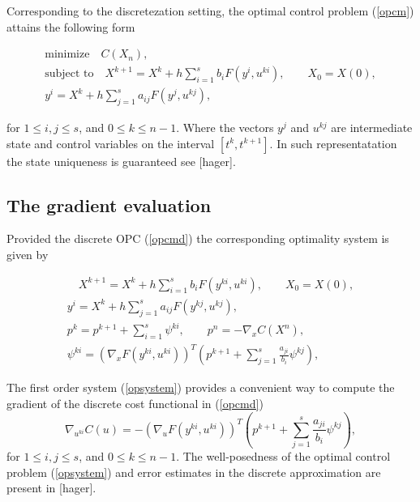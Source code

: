 \documentclass[a4paper,10pt, english]{article}
\newcommand{\D}{\displaystyle}
\begin{document}
 Corresponding to the discretezation setting, the optimal control problem (\ref{opcm})  attains the following form
 
 \begin{align}
  \D
  \mbox{minimize}\quad C(X_n),\\
   \mbox{subject to} \quad X^{k+1}  = X^k + h\sum_{i=1}^{s}b_iF(y^i, u^{ki}), \qquad X_0 = X(0),\\
	y^i = X^k + h\sum_{j=1}^{s}a_{ij}F(y^j, u^{kj}),
  \label{opcmd}
  \end{align}
 
 for $1\leq i, j\leq s$, and $0\leq k\leq n-1$.
 Where the vectors $y^j$ and $u^{kj}$ are intermediate state and control variables on the interval $[t^k, t^{k+1}]$. In such representatation the state uniqueness is guaranteed see [hager]. 
 
 
 


\subsection{The gradient evaluation}
Provided the discrete OPC (\ref{opcmd})  the corresponding  optimality system  is given by

  \begin{align}
   \D
    \quad X^{k+1}  = X^k + h\sum_{i=1}^{s}b_iF(y^{ki}, u^{ki}), \qquad X_0 = X(0),\\
 	y^i = X^k + h\sum_{j=1}^{s}a_{ij}F(y^{kj}, u^{kj}),\\
 	p^k = p^{k+1} + \sum_{i=1}^{s}\psi^{ki}, \qquad p^n = - \nabla_xC(X^n),\\
 	\psi^{ki} = (\nabla_x F(y^{ki}, u^{ki}))^{T} \left( p^{k+1} + \sum_{j=1}^{s} \frac{a_{ji}}{b_i}\psi^{kj}\right), 
   \label{opsystem}
   \end{align}

The first order system (\ref{opsystem}) provides a convenient way to compute the gradient of the discrete cost functional in (\ref{opcmd})
\begin{equation}
\nabla_{u^{ki}} C(u) = - (\nabla_u F(y^{ki}, u^{ki}))^{T} \left( p^{k+1} + \sum_{j=1}^{s}\frac{a_{ji}}{b_i}\psi^{kj}\right), 
\label{discretegradient}
 \end{equation}  
 for $1\leq i, j\leq s$, and $0\leq k\leq n-1$.
 The well-posedness of the optimal control problem (\ref{opsystem}) and error estimates in the discrete approximation are present in [hager].
 
\end{document}
